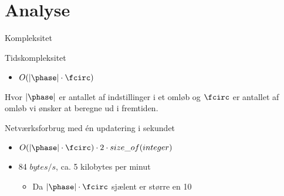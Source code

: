\section{Analyse}
\begin{frame}{Kompleksitet}

Tidskompleksitet
\begin{itemize}
\item $O(|\phase|\cdot \fcirc)$
\end{itemize}
Hvor $|\phase|$ er antallet af indstillinger i et omløb og $\fcirc$ er antallet af omløb vi ønsker at beregne ud i fremtiden.

\vspace{0.5cm}
Netværksforbrug med én updatering i sekundet
\begin{itemize}
\item $O(|\phase|\cdot \fcirc)\cdot 2\cdot size\_of(integer)$
\item 84 $bytes/s$, ca. 5 kilobytes per minut
\begin{itemize}
\item Da $|\phase|\cdot \fcirc$ sjælent er større en 10
\end{itemize}
\end{itemize}
\end{frame}
